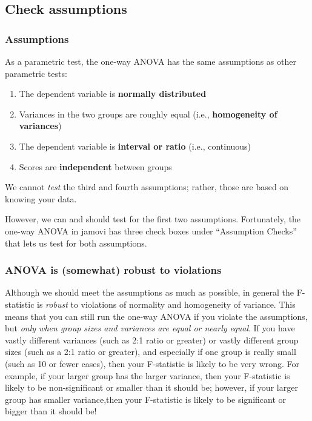\documentclass[
]{book}
\begin{document}
\hypertarget{anova-assumptions}{%
\subsection{Check assumptions}\label{anova-assumptions}}

\hypertarget{assumptions-3}{%
\subsubsection{Assumptions}\label{assumptions-3}}

As a parametric test, the one-way ANOVA has the same assumptions as other parametric tests:

\begin{enumerate}
\def\labelenumi{\arabic{enumi}.}
\item
  The dependent variable is \textbf{normally distributed}
\item
  Variances in the two groups are roughly equal (i.e., \textbf{homogeneity of variances})
\item
  The dependent variable is \textbf{interval or ratio} (i.e., continuous)
\item
  Scores are \textbf{independent} between groups
\end{enumerate}

We cannot \emph{test} the third and fourth assumptions; rather, those are based on knowing your data.

However, we can and should test for the first two assumptions. Fortunately, the one-way ANOVA in jamovi has three check boxes under ``Assumption Checks'' that lets us test for both assumptions.

\hypertarget{anova-is-somewhat-robust-to-violations}{%
\subsubsection{ANOVA is (somewhat) robust to violations}\label{anova-is-somewhat-robust-to-violations}}

Although we should meet the assumptions as much as possible, in general the F-statistic is \emph{robust} to violations of normality and homogeneity of variance. This means that you can still run the one-way ANOVA if you violate the assumptions, but \emph{only when group sizes and variances are equal or nearly equal}. If you have vastly different variances (such as 2:1 ratio or greater) or vastly different group sizes (such as a 2:1 ratio or greater), and especially if one group is really small (such as 10 or fewer cases), then your F-statistic is likely to be very wrong. For example, if your larger group has the larger variance, then your F-statistic is likely to be non-significant or smaller than it should be; however, if your larger group has smaller variance,then your F-statistic is likely to be significant or bigger than it should be!
\end{document}
